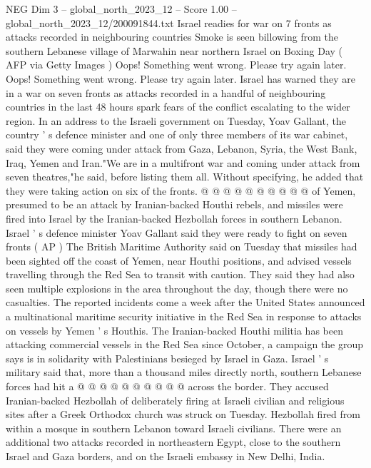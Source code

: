 \begin{textsample}{NEG Dim 3 – global\_north\_2023\_12 – Score 1.00 – global\_north\_2023\_12/200091844.txt}  \label{ex:f3_neg_196}
Israel readies for war on 7 fronts as attacks recorded in neighbouring countries Smoke is seen billowing from the southern Lebanese village of Marwahin near northern Israel on Boxing Day ( AFP via Getty Images ) Oops!
Something went wrong.
Please try again later.
Oops!
Something went wrong.
Please try again later.
Israel has warned they are in a war on seven fronts as attacks recorded in a handful of neighbouring countries in the last 48 hours spark fears of the conflict escalating to the wider region.
In an address to the Israeli government on Tuesday, Yoav Gallant, the country ' s defence minister and one of only three members of its war cabinet, said they were coming under attack from Gaza, Lebanon, Syria, the West Bank, Iraq, Yemen and Iran."We are in a multifront war and coming under attack from seven theatres,"he said, before listing them all.
Without specifying, he added that they were taking action on six of the fronts. @ @ @ @ @ @ @ @ @ @ of Yemen, presumed to be an attack by Iranian-backed Houthi rebels, and missiles were fired into Israel by the Iranian-backed Hezbollah forces in southern Lebanon.
Israel ' s defence minister Yoav Gallant said they were ready to fight on seven fronts ( AP ) The British Maritime Authority said on Tuesday that missiles had been sighted off the coast of Yemen, near Houthi positions, and advised vessels travelling through the Red Sea to transit with caution.
They said they had also seen multiple explosions in the area throughout the day, though there were no casualties.
The reported incidents come a week after the United States announced a multinational maritime security initiative in the Red Sea in response to attacks on vessels by Yemen ' s Houthis.
The Iranian-backed Houthi militia has been attacking commercial vessels in the Red Sea since October, a campaign the group says is in solidarity with Palestinians besieged by Israel in Gaza.
Israel ' s military said that, more than a thousand miles directly north, southern Lebanese forces had hit a @ @ @ @ @ @ @ @ @ @ across the border.
They accused Iranian-backed Hezbollah of deliberately firing at Israeli civilian and religious sites after a Greek Orthodox church was struck on Tuesday.
Hezbollah fired from within a mosque in southern Lebanon toward Israeli civilians.
There were an additional two attacks recorded in northeastern Egypt, close to the southern Israel and Gaza borders, and on the Israeli embassy in New Delhi, India.

\end{textsample}
